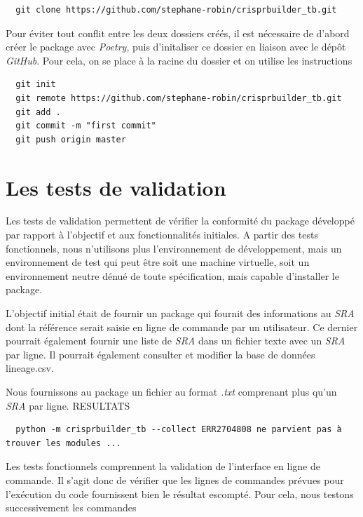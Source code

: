 \documentclass[twoside,a4paper,11pt,frenchb,openany]{report}
\begin{document}
\begin{verbatim}  git clone https://github.com/stephane-robin/crisprbuilder_tb.git\end{verbatim}

Pour éviter tout conflit entre les deux dossiers créés, il est nécessaire de d'abord créer le package avec \textit{Poetry}, puis d'initaliser ce dossier en liaison avec le dépôt \textit{GitHub}. Pour cela, on se place à la racine du dossier et on utilise les instructions

\begin{verbatim}
  git init
  git remote https://github.com/stephane-robin/crisprbuilder_tb.git
  git add .
  git commit -m "first commit"
  git push origin master
\end{verbatim} 





\section{Les tests de validation}

Les tests de validation permettent de vérifier la conformité du package développé par rapport à l'objectif et aux fonctionnalités initiales. A partir des tests fonctionnels, nous n'utilisons plus l'environnement de développement, mais un environnement de test qui peut être soit une machine virtuelle, soit un environnement neutre dénué de toute spécification, mais capable d'installer le package.

L'objectif initial était de fournir un package qui fournit des informations au \textit{SRA} dont la référence serait saisie en ligne de commande par un utilisateur. Ce dernier pourrait également fournir une liste de \textit{SRA} dans un fichier texte avec un \textit{SRA} par ligne. Il pourrait également consulter et modifier la base de données lineage.csv.

Nous fournissons au package un fichier au format \textit{.txt} comprenant plus qu'un \textit{SRA} par ligne. RESULTATS  

\begin{verbatim}
  python -m crisprbuilder_tb --collect ERR2704808 ne parvient pas à trouver les modules ...
\end{verbatim}

Les tests fonctionnels comprennent la validation de l'interface en ligne de commande. Il s'agit donc de vérifier que les lignes de commandes prévues pour l'exécution du code fournissent bien le résultat escompté. Pour cela, nous testons successivement les commandes
\end{document}
